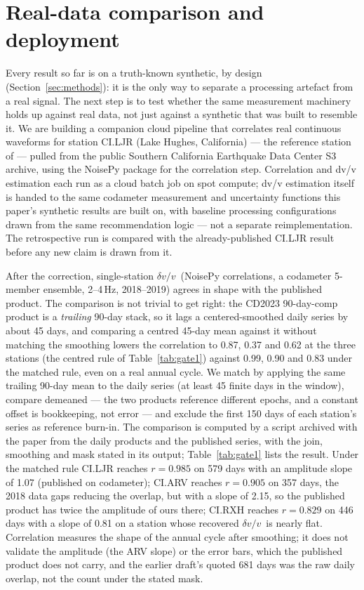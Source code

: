 \documentclass[
  referee]{gji}
\providecommand{\dvv}{\ensuremath{\delta v/v}}
\begin{document}
\section{Real-data comparison and deployment}\label{sec:deployment}

Every result so far is on a truth-known synthetic, by design
(Section~\ref{sec:methods}): it is the only way to separate a processing
artefact from a real signal. The next step is to test whether the same
measurement machinery holds up against real data, not just against a
synthetic that was built to resemble it. We are building a companion
cloud pipeline that correlates real continuous waveforms for station
CI.LJR (Lake Hughes, California) --- the reference station of
\citet{Clements2023} --- pulled from the public Southern California
Earthquake Data Center S3 archive, using the NoisePy package
\citep{Jiang2020} for the correlation step. Correlation and dv/v
estimation each run as a cloud batch job on spot compute; dv/v
estimation itself is handed to the same codameter measurement and
uncertainty functions this paper's synthetic results are built on, with
baseline processing configurations drawn from the same recommendation
logic --- not a separate reimplementation. The retrospective run is
compared with the already-published \citet{Clements2023} CI.LJR result
before any new claim is drawn from it.

After the correction, single-station \dvv~(NoisePy correlations, a
codameter 5-member ensemble, 2--4\(\,\)Hz, 2018--2019) agrees in shape
with the published \citet{Clements2023} product. The comparison is not
trivial to get right: the CD2023 90-day-comp product is a
\emph{trailing} 90-day stack, so it lags a centered-smoothed daily
series by about 45 days, and comparing a centred 45-day mean against it
without matching the smoothing lowers the correlation to 0.87, 0.37 and
0.62 at the three stations (the centred rule of Table~\ref{tab:gate1})
against 0.99, 0.90 and 0.83 under the matched rule, even on a real
annual cycle. We match by applying the same trailing 90-day mean to the
daily series (at least 45 finite days in the window), compare demeaned
--- the two products reference different epochs, and a constant offset
is bookkeeping, not error --- and exclude the first 150 days of each
station's series as reference burn-in. The comparison is computed by a
script archived with the paper from the daily products and the published
series, with the join, smoothing and mask stated in its output;
Table~\ref{tab:gate1} lists the result. Under the matched rule CI.LJR
reaches \(r=0.985\) on 579 days with an amplitude slope of 1.07
(published on codameter); CI.ARV reaches \(r=0.905\) on 357 days, the
2018 data gaps reducing the overlap, but with a slope of 2.15, so the
published product has twice the amplitude of ours there; CI.RXH reaches
\(r=0.829\) on 446 days with a slope of 0.81 on a station whose
recovered \dvv~is nearly flat. Correlation measures the shape of the
annual cycle after smoothing; it does not validate the amplitude (the
ARV slope) or the error bars, which the published product does not
carry, and the earlier draft's quoted 681 days was the raw daily
overlap, not the count under the stated mask.
\end{document}
